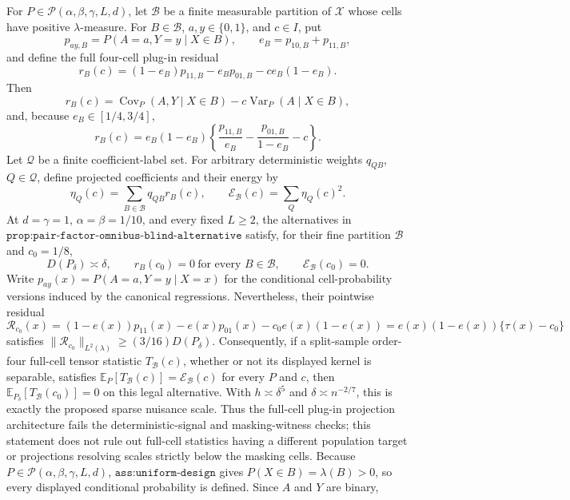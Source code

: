 For \(P\in\mathcal P(\alpha,\beta,\gamma,L,d)\), let \(\mathcal B\) be a finite measurable partition of \(\mathcal X\) whose cells have positive \(\lambda\)-measure.  For \(B\in\mathcal B\), \(a,y\in\{0,1\}\), and \(c\in I\), put
\[
 p_{ay,B}=P(A=a,Y=y\mid X\in B),\qquad
 e_B=p_{10,B}+p_{11,B},
\]
and define the full four-cell plug-in residual
\[
 r_B(c)=(1-e_B)p_{11,B}-e_Bp_{01,B}-c e_B(1-e_B).
\]
Then
\[
 r_B(c)=\operatorname{Cov}_P(A,Y\mid X\in B)
          -c\operatorname{Var}_P(A\mid X\in B),                                      \tag{38}
\]
and, because \(e_B\in[1/4,3/4]\),
\[
 r_B(c)=e_B(1-e_B)
 \left\{\frac{p_{11,B}}{e_B}-\frac{p_{01,B}}{1-e_B}-c\right\}.                       \tag{39}
\]
Let \(\mathcal Q\) be a finite coefficient-label set.  For arbitrary deterministic weights \(q_{QB}\), \(Q\in\mathcal Q\), define projected coefficients and their energy by
\[
 \eta_Q(c)=\sum_{B\in\mathcal B}q_{QB}r_B(c),
 \qquad
 \mathcal E_{\mathcal B}(c)=\sum_Q\eta_Q(c)^2.                                       \tag{40}
\]
At \(d=\gamma=1\), \(\alpha=\beta=1/10\), and every fixed \(L\ge2\), the alternatives in \(\texttt{prop:pair-factor-omnibus-blind-alternative}\) satisfy, for their fine partition \(\mathcal B\) and \(c_0=1/8\),
\[
 D(P_\delta)\asymp\delta,
 \qquad r_B(c_0)=0\ \text{for every }B\in\mathcal B,
 \qquad \mathcal E_{\mathcal B}(c_0)=0.                                               \tag{41}
\]
Write \(p_{ay}(x)=P(A=a,Y=y\mid X=x)\) for the conditional cell-probability versions induced by the canonical regressions.  Nevertheless, their pointwise residual
\[
 \mathcal R_{c_0}(x)=(1-e(x))p_{11}(x)-e(x)p_{01}(x)-c_0e(x)(1-e(x))
                    =e(x)(1-e(x))\{\tau(x)-c_0\}
\]
satisfies \(\|\mathcal R_{c_0}\|_{L^2(\lambda)}\ge(3/16)D(P_\delta)\).  Consequently, if a split-sample order-four full-cell tensor statistic \(T_{\mathcal B}(c)\), whether or not its displayed kernel is separable, satisfies \(\mathbb E_P[T_{\mathcal B}(c)]=\mathcal E_{\mathcal B}(c)\) for every \(P\) and \(c\), then \(\mathbb E_{P_\delta}[T_{\mathcal B}(c_0)]=0\) on this legal alternative.  With \(h\asymp\delta^5\) and \(\delta\asymp n^{-2/7}\), this is exactly the proposed sparse nuisance scale.  Thus the full-cell plug-in projection architecture fails the deterministic-signal and masking-witness checks; this statement does not rule out full-cell statistics having a different population target or projections resolving scales strictly below the masking cells.
Because \(P\in\mathcal P(\alpha,\beta,\gamma,L,d)\), \(\texttt{ass:uniform-design}\) gives \(P(X\in B)=\lambda(B)>0\), so every displayed conditional probability is defined.  Since \(A\) and \(Y\) are binary,
